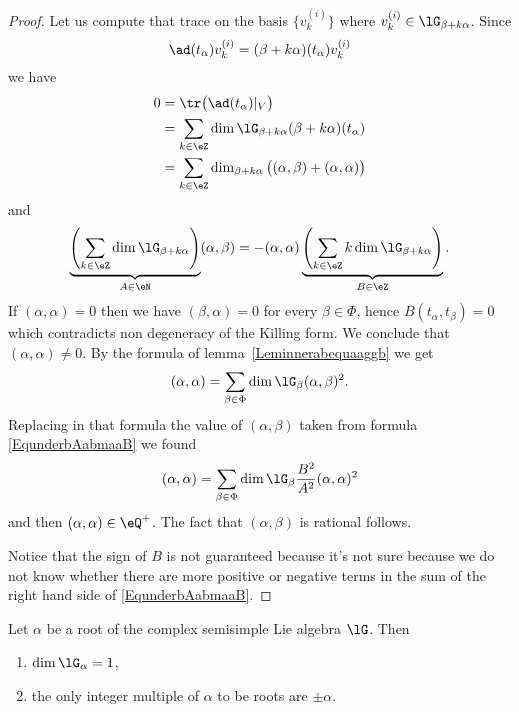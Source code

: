 \begin{proof}
	Let us compute that trace on the basis \( \{ v_k^{(i)} \}\) where \( v_k^{(i)}\in\lG_{\beta+k\alpha}\). Since
	\begin{equation}
		\ad(t_{\alpha})v_k^{(i)}=(\beta+k\alpha)(t_{\alpha})v_k^{(i)}
	\end{equation}
	we have
	\begin{subequations}
		\begin{align}
			0 & =\tr\big( \ad(t_{\alpha})|_V \big)                                            \\
			  & =\sum_{k\in\eZ}\dim\lG_{\beta+k\alpha}(\beta+k\alpha)(t_{\alpha})             \\
			  & =\sum_{k\in\eZ}\dim_{\beta+k\alpha}\big( (\alpha,\beta)+(\alpha,\alpha) \big)
		\end{align}
	\end{subequations}
	and
	\begin{equation}        \label{EqunderbAabmaaB}
		\underbrace{\left( \sum_{k\in\eZ}\dim\lG_{\beta+k\alpha} \right)}_{A\in\eN}(\alpha,\beta)=-(\alpha,\alpha)\underbrace{\left( \sum_{k\in\eZ}k\dim\lG_{\beta+k\alpha} \right)}_{B\in\eZ}.
	\end{equation}
	If \( (\alpha,\alpha)=0\) then we have \( (\beta,\alpha)=0\) for every \( \beta\in\Phi\), hence \( B(t_{\alpha},t_{\beta})=0\) which contradicts non degeneracy of the Killing form. We conclude that \( (\alpha,\alpha)\neq 0\). By the formula of lemma~\ref{Leminnerabequaaggb} we get
	\begin{equation}
		(\alpha,\alpha)=\sum_{\beta\in\Phi}\dim\lG_{\beta}(\alpha,\beta)^2.
	\end{equation}
	Replacing in that formula the value of \( (\alpha,\beta)\) taken from formula \eqref{EqunderbAabmaaB} we found
	\begin{equation}
		(\alpha,\alpha)=\sum_{\beta\in\Phi}\dim\lG_{\beta}\frac{ B^2 }{ A^2 }(\alpha,\alpha)^2
	\end{equation}
	and then \( (\alpha,\alpha)\in\eQ^+\). The fact that \( (\alpha,\beta)\) is rational follows.

	Notice that the sign of \( B\) is not guaranteed because it's not sure because we do not know whether there are more positive or negative terms in the sum of the right hand side of \eqref{EqunderbAabmaaB}.
\end{proof}

\begin{proposition}
	Let \( \alpha\) be a root of the complex semisimple Lie algebra \( \lG\). Then
	\begin{enumerate}
		\item
		      \( \dim\lG_{\alpha}=1\),
		\item
		      the only integer multiple of \( \alpha\) to be roots are \( \pm\alpha\).
	\end{enumerate}
\end{proposition}

